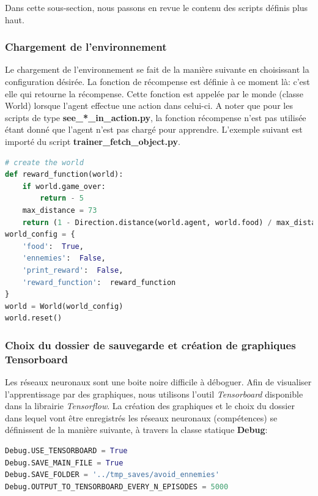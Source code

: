 \documentclass[11pt,a4paper]{report}
\begin{document}
  \par Dans cette sous-section, nous passons en revue le contenu des scripts définis plus haut. 
  
  \subsubsection{Chargement de l'environnement}
  
  \par Le chargement de l'environnement se fait de la manière suivante en choisissant la configuration désirée. La fonction de récompense est définie à ce moment là: c'est elle qui retourne la récompense. Cette fonction est appelée par le monde (classe World) lorsque l'agent effectue une action dans celui-ci. A noter que pour les scripts de type \textbf{see\_*\_in\_action.py}, la fonction récompense n'est pas utilisée étant donné que l'agent n'est pas chargé pour apprendre. L'exemple suivant est importé du script \textbf{trainer\_fetch\_object.py}.
  
  \begin{lstlisting}[language=python]
# create the world
def reward_function(world):
    if world.game_over:
        return - 5
    max_distance = 73
    return (1 - Direction.distance(world.agent, world.food) / max_distance)
world_config = {
    'food':  True,
    'ennemies':  False,
    'print_reward':  False,
    'reward_function':  reward_function
}
world = World(world_config)
world.reset()
  \end{lstlisting}   
  
  \subsubsection{Choix du dossier de sauvegarde et création de graphiques Tensorboard}
  
  \par Les réseaux neuronaux sont une boite noire difficile à déboguer. Afin de visualiser l'apprentissage par des graphiques, nous utilisons l'outil \textit{Tensorboard} disponible dans la librairie \textit{Tensorflow}. La création des graphiques et le choix du dossier dans lequel vont être enregistrés les réseaux neuronaux (compétences) se définissent de la manière suivante, à travers la classe statique \textbf{Debug}: 
  
  \begin{lstlisting}[language=python]
Debug.USE_TENSORBOARD = True
Debug.SAVE_MAIN_FILE = True
Debug.SAVE_FOLDER = '../tmp_saves/avoid_ennemies'
Debug.OUTPUT_TO_TENSORBOARD_EVERY_N_EPISODES = 5000
  \end{lstlisting}   
  
\end{document}
